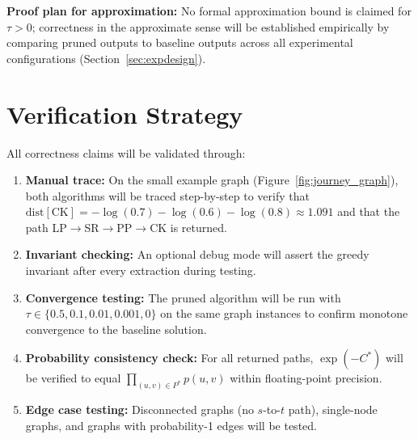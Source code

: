 \textbf{Proof plan for approximation:} No formal approximation bound is claimed for $\tau > 0$; correctness in the approximate sense will be established empirically by comparing pruned outputs to baseline outputs across all experimental configurations (Section~\ref{sec:expdesign}).

\section{Verification Strategy}

All correctness claims will be validated through:
\begin{enumerate}
    \item \textbf{Manual trace:} On the small example graph (Figure~\ref{fig:journey_graph}), both algorithms will be traced step-by-step to verify that $\text{dist}[\text{CK}] = -\log(0.7) - \log(0.6) - \log(0.8) \approx 1.091$ and that the path LP$\to$SR$\to$PP$\to$CK is returned.
    \item \textbf{Invariant checking:} An optional debug mode will assert the greedy invariant after every extraction during testing.
    \item \textbf{Convergence testing:} The pruned algorithm will be run with $\tau \in \{0.5, 0.1, 0.01, 0.001, 0\}$ on the same graph instances to confirm monotone convergence to the baseline solution.
    \item \textbf{Probability consistency check:} For all returned paths, $\exp(-C^*)$ will be verified to equal $\prod_{(u,v)\in P^*} p(u,v)$ within floating-point precision.
    \item \textbf{Edge case testing:} Disconnected graphs (no $s$-to-$t$ path), single-node graphs, and graphs with probability-1 edges will be tested.
\end{enumerate}
